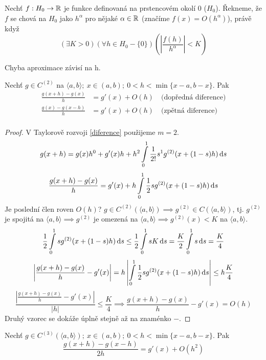 	\begin{definition}
		Nechť $f:H_0 \rightarrow \mathbb{R}$ je funkce definovaná na prstencovém okolí 0 ($H_0$).
		Řekneme, že $f$ se chová na $H_0$ jako $h^\alpha$ pro nějaké $\alpha \in \mathbb{R}$
		(značíme $f(x) = O(h^\alpha)$), právě když
		\begin{equation} \label{landau}
			(\exists K > 0)(\forall h \in H_0 - \{0\}) 
			\left( \left| \frac{f(h)}{h^\alpha}\right|  <K \right)	
		\end{equation}
		
	\end{definition}
	
	\begin{note}
		Chyba aproximace závisí na h.
	\end{note}
	
	\begin{theorem}
		Nechť $g \in C^{(2)}$ na $\langle a,b \rangle;\ x \in (a,b);\ 0 < h < \min\{x-a, b-x\}$. Pak
		\begin{align*}
			\frac{g(x+h) -g(x)}{h} &= g'(x) + O(h)\quad \text{(dopředná diference)}\\
			\frac{g(x) - g(x-h)}{h} &= g'(x) + O(h)\quad \text{(zpětná diference)}\\
		\end{align*}
	\end{theorem}
	
	\begin{proof}
		V Taylorově rozvoji \eqref{diference} použijeme $m=2$.
		$$ g(x+h) = g(x) h^0 + g'(x)h + h^2 \int\limits_0^1 \frac{1}{2!} s^1 g^{(2)}(x+(1-s)h)\,\mathrm{d}s$$
		$$ \frac{g(x+h) - g(x)}{h} = g'(x) + h\int\limits_0^1 \frac{1}{2} s g^{(2)}(x+(1-s)h)\,\mathrm{d}s$$
		Je poslední člen roven $O(h)$? $g \in C^{(2)}(\langle a, b\rangle) \implies g^{(2)}
		\in C(\langle a, b\rangle)$, tj. $g^{(2)}$ je spojitá na $\langle a, b\rangle \implies
		g^{(2)}$ je omezená na $\langle a, b\rangle \implies g^{(2)}(x) < K$ na
		$\langle a, b\rangle$.
		$$ \frac{1}{2} \int\limits_0^1 s g^{(2)}(x+(1-s)h)\,\mathrm{d}s \leq \frac{1}{2}\int\limits_0^1 sK\,\mathrm{d}s = 
		\frac{K}{2}\int\limits_0^1 s\,\mathrm{d}s = \frac{K}{4}$$
		$$ \left| \frac{g(x+h) - g(x)}{h} - g'(x) \right|= h \left|\int\limits_0^1 \frac{1}{2} s g^{(2)}
		(x + (1 -s) h)\,\mathrm{d}s\right| \leq h\frac{K}{4}$$
		$$ \frac{\left| \frac{g(x+h) - g(x)}{h} - g'(x) \right|}{|h|} \leq \frac{K}{4} \implies
		\frac{g(x+h) - g(x)}{h} - g'(x) = O(h)$$
		Druhý vzorec se dokáže úplně stejně až na znaménko $-$.
	\end{proof}
	
	\begin{theorem}
		Nechť $g \in C^{(3)} (\langle a,b \rangle);\ x \in (a,b);\ 0 < h < \min\{ x-a, b-x\}$.
		Pak
		$$ \frac{g(x+h) - g(x-h)}{2h} = g'(x) + O(h^2)$$
	\end{theorem}
	
